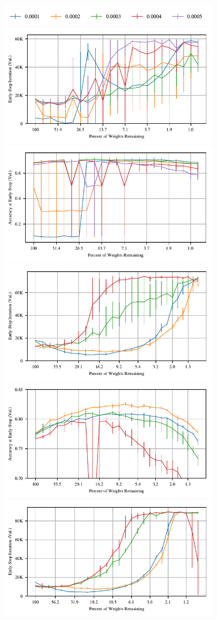 \begin{figure}
\centering
\includegraphics[width=.5\textwidth]{graphs/cifar10/conv/dropout_adam_rate_sweep1/legend}
\includegraphics[width=.5\textwidth]{graphs/cifar10/conv/dropout_adam_rate_sweep1/iteration}%
\includegraphics[width=.5\textwidth]{graphs/cifar10/conv/dropout_adam_rate_sweep1/accuracy}
\includegraphics[width=.5\textwidth]{graphs/cifar10/conv/dropout_adam_rate_sweep2/iteration}%
\includegraphics[width=.5\textwidth]{graphs/cifar10/conv/dropout_adam_rate_sweep2/accuracy}
\includegraphics[width=.5\textwidth]{graphs/cifar10/conv/dropout_adam_rate_sweep3/iteration}%

\end{figure}
